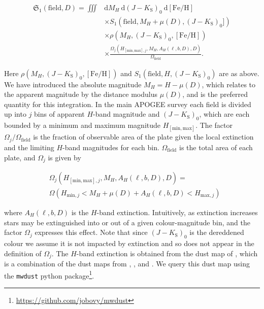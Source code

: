\begin{equation}
\label{ch3:eq:effective-selection-function}
\begin{split}
\mathfrak{S}_{1}(\mathrm{field},D) = \iiint & \mathrm{d} M_{H}\ \mathrm{d} (J-K_\mathrm{S})_{0}\ \mathrm{d} [\mathrm{Fe/H}] \\
& \times S_{1}(\mathrm{field}, M_{H}+\mu(D), (J-K_\mathrm{S})_{0}]) \\
& \times \rho(M_{H},(J-K_\mathrm{S})_{0}, [\mathrm{Fe/H}]) \\
& \times \frac{\Omega_{j}(H_{[\mathrm{min},\mathrm{max}],j},M_{H},A_{H}(\ell,b,D),D)}{\Omega_\mathrm{field}}.
\end{split}
\end{equation}

Here $\rho(M_{H},(J-K_\mathrm{S})_{0},[\mathrm{Fe/H}])$ and $S_{1}(\mathrm{field}, H, (J-K_\mathrm{S})_{0})$ are as above. We have introduced the absolute magnitude $M_{H} = H - \mu(D)$, which relates to the apparent magnitude by the distance modulus $\mu(D)$, and is the preferred quantity for this integration. In the main APOGEE survey each field is divided up into $j$ bins of apparent ${H}$-band magnitude and $(J-K_\mathrm{S})_{0}$, which are each bounded by a minimum and maximum magnitude $H_{[\mathrm{min},\mathrm{max}]}$. The factor $\Omega_{j}/\Omega_\mathrm{field}$ is the fraction of observable area of the plate given the local extinction and the limiting $H$-band magnitudes for each bin. $\Omega_\mathrm{field}$ is the total area of each plate, and $\Omega_{j}$ is given by

\begin{equation}
\begin{split}
& \Omega_{j}(H_{[\mathrm{min},\mathrm{max}],j},M_{H},A_{H}(\ell,b,D),D) = \\
& \Omega(H_{\mathrm{min},j} < M_{H}+\mu(D)+A_{H}(\ell,b,D) < H_{\mathrm{max},j} )
\end{split}
\end{equation}

\noindent where $A_{H}(\ell,b,D)$ is the $H$-band extinction. Intuitively, as extinction increases stars may be extinguished into or out of a given colour-magnitude bin, and the factor $\Omega_{j}$ expresses this effect. Note that since $(J-K_\mathrm{S})_{0}$ is the dereddened colour we assume it is not impacted by extinction and so does not appear in the definition of $\Omega_{j}$. The $H$-band extinction is obtained from the dust map of \textcite{bovy16a}, which is a combination of the dust maps from \textcite{marshall06}, \textcite{green15}, and \textcite{drimmel03}. We query this dust map using the \texttt{mwdust} python package\footnote{\url{https://github.com/jobovy/mwdust}}.

